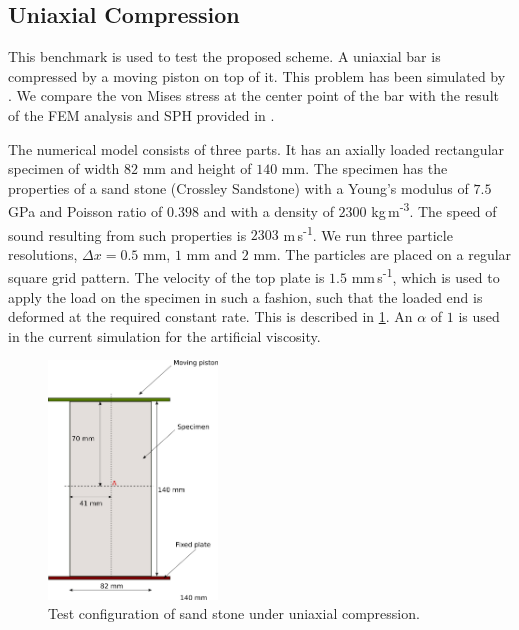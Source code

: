 %
%
%
%
\FloatBarrier%
\subsection{Uniaxial Compression}
\label{sec:uniaxial-compression}

This benchmark is used to test the proposed scheme. A uniaxial bar is
compressed by a moving piston on top of it. This problem has been simulated by
\cite{das2015evaluation}. We compare the von Mises stress at the center point
of the bar with the result of the FEM analysis and SPH provided in
\citep{das2015evaluation}.

The numerical model consists of three parts. It has an axially loaded
rectangular specimen of width $82$ mm and height of $140$ mm. The specimen has
the properties of a sand stone (Crossley Sandstone) with a Young's modulus of
$7.5$ GPa and Poisson ratio of $0.398$ and with a density of $2300$
kg\,m\textsuperscript{-3}. The speed of sound resulting from such properties is
$2303$ m\,s\textsuperscript{-1}. We run three particle resolutions,
$\Delta x = 0.5$ mm, $1$ mm and $2$ mm. The particles are placed on a regular
square grid pattern. The velocity of the top plate is
$1.5$ mm\,s\textsuperscript{-1}, which is used to apply the load on the specimen in
such a fashion, such that the loaded end is deformed at the required constant
rate. This is described in \cref{fig:uniaxial_test_configuration}. An $\alpha$
of $1$ is used in the current simulation for the artificial viscosity.

\begin{figure}[!htp]
  \centering
  \includegraphics[width=0.4\textwidth]{images/ctvf/images/uniaxial_compression/uniaxial_compression}
  \caption{Test configuration of sand stone under uniaxial compression.}
\label{fig:uniaxial_test_configuration}
\end{figure}



